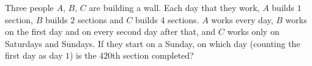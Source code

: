 Three people $A$, $B$, $C$ are building a wall. Each day that they work, $A$ builds $1$ section, $B$ builds $2$ sections and $C$ builds $4$ sections. $A$ works every day, $B$ works on the first day and on every second day after that, and $C$ works only on Saturdays and Sundays. If they start on a Sunday, on which day (counting the first day as day $1$) is the $420$th section completed?
